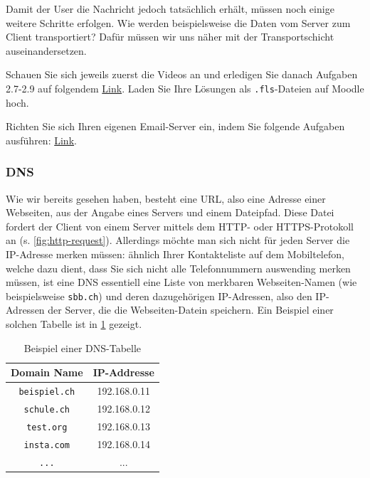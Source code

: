 Damit der User die Nachricht jedoch tatsächlich erhält, müssen noch einige weitere Schritte erfolgen. Wie werden beispielsweise die Daten vom Server zum Client transportiert? Dafür müssen wir uns näher mit der Transportschicht auseinandersetzen.

\begin{myexercise}
	Schauen Sie sich jeweils zuerst die Videos an und erledigen Sie danach Aufgaben 2.7-2.9 auf folgendem \href{https://informatik.mygymer.ch/base/?book=network}{Link}. Laden Sie Ihre Lösungen als \texttt{.fls}-Dateien auf Moodle hoch.
\end{myexercise}

\begin{mychallenge}
	Richten Sie sich Ihren eigenen Email-Server ein, indem Sie folgende Aufgaben ausführen: \href{https://inf-schule.de/rechnernetze/filius/internet/exkurs_email}{Link}.
\end{mychallenge}

\subsubsection{DNS}
Wie wir bereits gesehen haben, besteht eine \gls{URL}, also eine Adresse einer Webseiten, aus der Angabe eines Servers und einem Dateipfad. Diese Datei fordert der Client von einem Server mittels dem \gls{HTTP}- oder \gls{HTTPS}-Protokoll an (s. \cref{fig:http-request}). Allerdings möchte man sich nicht für jeden Server die IP-Adresse merken müssen: ähnlich Ihrer Kontakteliste auf dem Mobiltelefon, welche dazu dient, dass Sie sich nicht alle Telefonnummern auswending merken müssen, ist eine \gls{DNS} essentiell eine Liste von merkbaren Webseiten-Namen (wie beispielsweise \texttt{sbb.ch}) und deren dazugehörigen \gls{IP}-Adressen, also den \gls{IP}-Adressen der Server, die die Webseiten-Datein speichern. Ein Beispiel einer solchen Tabelle ist in \cref{tab:dnsEntries} gezeigt.

\begin{table}[H]
	\centering
	\begin{tabular}{c|c}
		\textbf{Domain Name} & \textbf{IP-Addresse} \\
		\midrule\midrule
		\texttt{beispiel.ch} & 192.168.0.11         \\
		\midrule
		\texttt{schule.ch}   & 192.168.0.12         \\
		\midrule
		\texttt{test.org}    & 192.168.0.13         \\
		\midrule
		\texttt{insta.com}   & 192.168.0.14         \\
		\midrule
		\texttt{...}         & ...                  \\
	\end{tabular}
	\caption{Beispiel einer \gls{DNS}-Tabelle}
	\label{tab:dnsEntries}
\end{table}

